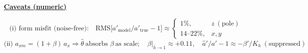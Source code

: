 \documentclass[11pt,a4paper]{ctexart}
\newcommand{\hd}[1]{\par\medskip\noindent\underline{\textbf{#1}}\par\nobreak\vspace{0.2ex}}
\begin{document}
\hd{Caveats (numeric)}
\[ \text{(i) form misfit (noise-free):}\quad
\mathrm{RMS}\big[a'_{\mathrm{model}}/a'_{\mathrm{true}} - 1\big] \approx
\begin{cases} 1\%, & z\ (\text{pole}) \\ 14\text{--}22\%, & x,y \end{cases} \]
\[ \text{(ii) } a_{xm} = (1+\beta)\,a_x \Rightarrow \hat\theta\ \text{absorbs }\beta\ \text{as scale};\quad
\beta\big|_{\bar h\to 1} \approx +0.11,\quad
\hat a'/a' - 1 \approx -\beta'/K_h\ (\text{suppressed}) \]
\end{document}
